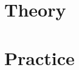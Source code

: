 \documentclass{book}
\begin{document}
\frontmatter




\mainmatter
\tableofcontents

\part{Theory}








\part{Practice}





\backmatter


\end{document}
